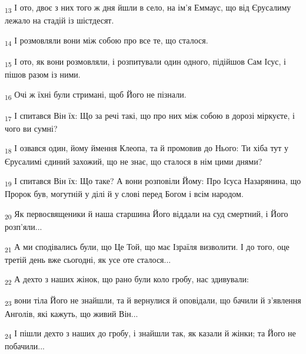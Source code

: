 \begin{tcolorbox}
\textsubscript{13} І ото, двоє з них того ж дня йшли в село, на ім'я Еммаус, що від Єрусалиму лежало на стадій із шістдесят.
\end{tcolorbox}
\begin{tcolorbox}
\textsubscript{14} І розмовляли вони між собою про все те, що сталося.
\end{tcolorbox}
\begin{tcolorbox}
\textsubscript{15} І ото, як вони розмовляли, і розпитували один одного, підійшов Сам Ісус, і пішов разом із ними.
\end{tcolorbox}
\begin{tcolorbox}
\textsubscript{16} Очі ж їхні були стримані, щоб Його не пізнали.
\end{tcolorbox}
\begin{tcolorbox}
\textsubscript{17} І спитався Він їх: Що за речі такі, що про них між собою в дорозі міркуєте, і чого ви сумні?
\end{tcolorbox}
\begin{tcolorbox}
\textsubscript{18} І озвався один, йому ймення Клеопа, та й промовив до Нього: Ти хіба тут у Єрусалимі єдиний захожий, що не знає, що сталося в нім цими днями?
\end{tcolorbox}
\begin{tcolorbox}
\textsubscript{19} І спитався Він їх: Що таке? А вони розповіли Йому: Про Ісуса Назарянина, що Пророк був, могутній у ділі й у слові перед Богом і всім народом.
\end{tcolorbox}
\begin{tcolorbox}
\textsubscript{20} Як первосвященики й наша старшина Його віддали на суд смертний, і Його розп'яли...
\end{tcolorbox}
\begin{tcolorbox}
\textsubscript{21} А ми сподівались були, що Це Той, що має Ізраїля визволити. І до того, оце третій день вже сьогодні, як усе оте сталося...
\end{tcolorbox}
\begin{tcolorbox}
\textsubscript{22} А дехто з наших жінок, що рано були коло гробу, нас здивували:
\end{tcolorbox}
\begin{tcolorbox}
\textsubscript{23} вони тіла Його не знайшли, та й вернулися й оповідали, що бачили й з'явлення Анголів, які кажуть, що живий Він...
\end{tcolorbox}
\begin{tcolorbox}
\textsubscript{24} І пішли дехто з наших до гробу, і знайшли так, як казали й жінки; та Його не побачили...
\end{tcolorbox}
